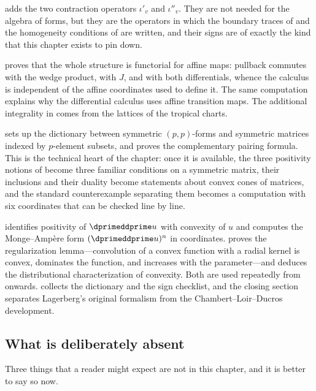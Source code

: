  adds the two contraction operators
$\iota'_v$ and $\iota''_v$.  They are not needed for the algebra of forms,
but they are the operators in which the boundary traces of
 and the homogeneity conditions of
 are written, and their signs are of exactly the
kind that this chapter exists to pin down.

 proves that the whole structure is functorial for
affine maps: pullback commutes with the wedge product, with $J$, and with
both differentials, whence the calculus is independent of the affine
coordinates used to define it.  The same computation explains why the
differential calculus uses affine transition maps.  The additional
integrality in  comes from the lattices of the
tropical charts.

 sets up the dictionary between symmetric
$(p,p)$-forms and symmetric matrices indexed by $p$-element subsets, and
proves the complementary pairing formula.  This is the technical heart of the
chapter: once it is available, the three positivity notions of
 become three familiar conditions on a symmetric
matrix, their inclusions and their duality become statements about convex
cones of matrices, and the standard counterexample separating them becomes a
computation with six coordinates that can be checked line by line.

 identifies positivity of $\dprimeddprime u$ with
convexity of $u$ and computes the Monge--Amp\`ere form
$(\dprimeddprime u)^n$ in coordinates.
 proves the regularization lemma---convolution
of a convex function with a radial kernel is convex, dominates the function,
and increases with the parameter---and deduces the distributional
characterization of convexity.  Both are used repeatedly from
 onwards.
 collects the dictionary and the sign checklist,
and the closing section separates Lagerberg's original formalism from the
Chambert--Loir--Ducros development.

\subsection*{What is deliberately absent}

Three things that a reader might expect are not in this chapter, and it is
better to say so now.

